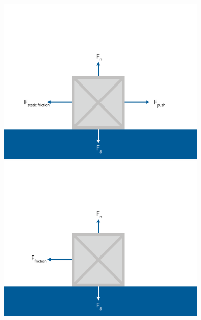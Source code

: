 \includegraphics[width=0.75\textwidth]{friction-06.png}
\includegraphics[width=0.75\textwidth]{friction-07.png}








